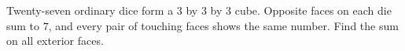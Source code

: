 Twenty-seven ordinary dice form a $3$ by $3$ by $3$ cube. Opposite faces on each die sum to $7$, and every pair of touching faces shows the same number. Find the sum on all exterior faces.
